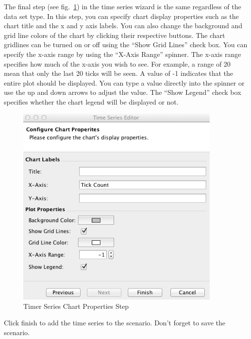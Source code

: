 \documentclass[11pt]{amsart}
\begin{document}
The final step (see fig.~\ref{fig:ts4}) in the time series wizard is the same regardless of the data set type. In this step, you can specify chart display properties such as the chart title and the x and y axis labels. You can also change the background and grid line colors of the chart by clicking their respective buttons. The chart gridlines can be turned on or off using the ``Show Grid Lines'' check box. You can specify the x-axis range by using the ``X-Axis Range'' spinner. The x-axis range specifies how much of the x-axis you wish to see. For example, a range of 20 mean that only the last 20 ticks will be seen. A value of -1 indicates that the entire plot should be displayed. You can type a value directly into the spinner or use the up and down arrows to adjust the value. The ``Show Legend'' check box specifies whether the chart legend will be displayed or not.

\begin{figure}[h]
\begin{center}
\vspace{.2in}
\centerline {
\includegraphics[width=4in]{images/ts4.png}
}
\caption{Timer Series Chart Properties Step}
\label{fig:ts4}
\end{center}
\end{figure}

Click finish to add the time series to the scenario. Don't forget to save the scenario.
\end{document}
